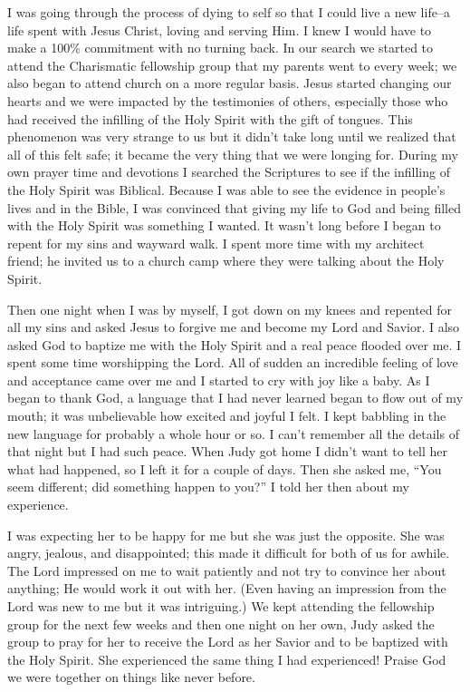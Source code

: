 \documentclass[oneside]{book}
\begin{document}
I was going through the process of dying to self so that I could live a new life--a life spent with Jesus Christ, loving and serving Him. I knew I would have to make a 100\% commitment with no turning back. In our search we started to attend the Charismatic fellowship group that my parents went to every week; we also began to attend church on a more regular basis. Jesus started changing our hearts and we were impacted by the testimonies of others, especially those who had received the infilling of the Holy Spirit with the gift of tongues. This phenomenon was very strange to us but it didn't take long until we realized that all of this felt safe; it became the very thing that we were longing for. During my own prayer time and devotions I searched the Scriptures to see if the infilling of the Holy Spirit was Biblical. Because I was able to see the evidence in people’s lives and in the Bible, I was convinced that giving my life to God and being filled with the Holy Spirit was something I wanted. It wasn’t long before I began to repent for my sins and wayward walk. I spent more time with my architect friend; he invited us to a church camp where they were talking about the Holy Spirit. 

Then one night when I was by myself, I got down on my knees and repented for all my sins and asked Jesus to forgive me and become my Lord and Savior. I also asked God to baptize me with the Holy Spirit and a real peace flooded over me. I spent some time worshipping the Lord. All of sudden an incredible feeling of love and acceptance came over me and I started to cry with joy like a baby. As I began to thank God, a language that I had never learned began to flow out of my mouth; it was unbelievable how excited and joyful I felt. I kept babbling in the new language for probably a whole hour or so. I can't remember all the details of that night but I had such peace. When Judy got home I didn't want to tell her what had happened, so I left it for a couple of days. Then she asked me, “You seem different; did something happen to you?” I told her then about my experience. 

I was expecting her to be happy for me but she was just the opposite. She was angry, jealous, and disappointed; this made it difficult for both of us for awhile. The Lord impressed on me to wait patiently and not try to convince her about anything; He would work it out with her. (Even having an impression from the Lord was new to me but it was intriguing.) We kept attending the fellowship group for the next few weeks and then one night on her own, Judy asked the group to pray for her to receive the Lord as her Savior and to be baptized with the Holy Spirit. She experienced the same thing I had experienced! Praise God we were together on things like never before. 
\end{document}
